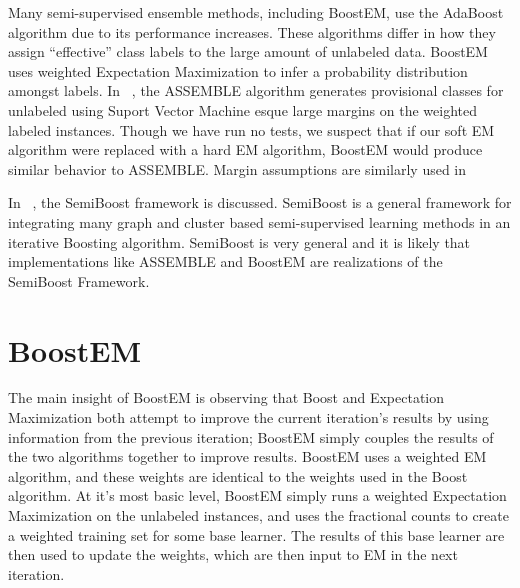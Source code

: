 \documentclass{sig-alternate}
\begin{document}
Many semi-supervised ensemble methods, including BoostEM, use the AdaBoost algorithm due to its performance increases. These algorithms differ in how they assign ``effective'' class labels to the large amount of unlabeled data.  BoostEM uses weighted Expectation Maximization to infer a probability distribution amongst labels. In ~\cite{bennett2002exploiting}, the ASSEMBLE algorithm generates provisional classes for unlabeled using Suport Vector Machine esque large margins on the weighted labeled instances.  Though we have run no tests, we suspect that if our soft EM algorithm were replaced with a hard EM algorithm, BoostEM would produce similar behavior to ASSEMBLE. Margin assumptions are similarly used in ~\cite{grandvalet2001semi}

In ~\cite{kumar2009semiboost}, the SemiBoost framework is discussed. SemiBoost is a general framework for integrating many graph and cluster based semi-supervised learning methods in an iterative Boosting algorithm.  SemiBoost is very general and it is likely that implementations like ASSEMBLE and BoostEM are realizations of the SemiBoost Framework.  



\section{BoostEM}
The main insight of BoostEM is observing that Boost and Expectation Maximization both attempt to improve the current iteration's results by using information from the previous iteration; BoostEM simply couples the results of the two algorithms together to improve results.  BoostEM uses a weighted EM algorithm, and these weights are identical to the weights used in the Boost algorithm.  At it's most basic level, BoostEM simply runs a weighted Expectation Maximization on the unlabeled instances, and uses the fractional counts to create a weighted training set for some base learner.  The results of this base learner are then used to update the weights, which are then input to EM in the next iteration. 
\end{document}
